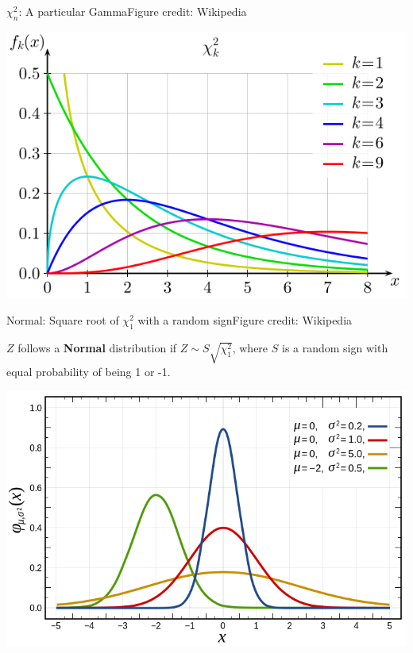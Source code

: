 \documentclass{beamer}
\begin{document}
\begin{frame}{$\chi^2_n$: A particular Gamma}{Figure credit: Wikipedia}
\begin{center}\includegraphics[scale=.4]{figures/Chi2PDF.png}\end{center}
\end{frame}

\begin{frame}{Normal: Square root of $\chi^2_1$ with a random sign}{Figure credit: Wikipedia}
\begin{definition}
$Z$ follows a \textbf{Normal} distribution if $Z\sim S\sqrt{\chi^2_1}$, where $S$ is a random sign with equal probability of being 1 or -1.
\end{definition}
\begin{center}\includegraphics[scale=.3]{figures/NormalPDF.png}\end{center}
\end{frame}
\end{document}
